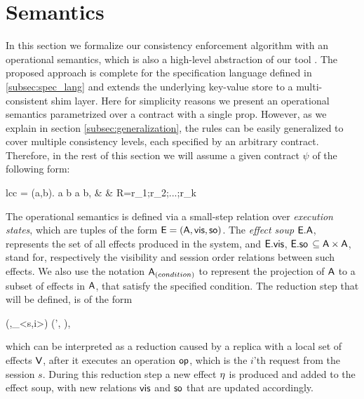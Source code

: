 %
%
\section{Semantics}
\label{sec:semantics}
In this section we formalize our consistency enforcement algorithm with an
operational semantics, which is also a high-level abstraction of our
tool \tool.
The proposed approach is complete for the specification language defined
in \ref{subsec:spec_lang}
and extends the underlying key-value store to a multi-consistent shim
layer. Here for simplicity reasons we present an operational semantics 
parametrized over a contract with a single prop. However, as we explain
in section \ref{subsec:generalization}, the rules can be easily
generalized to cover multiple consistency levels, each specified by an
arbitrary contract. Therefore, in the rest of this section we will assume a given contract $\psi$ of the
following form:
	\begin{smathpar}
	\begin{array}{lcc}
		\psi = \forall (a,b). a  b  \Rightarrow a
		\xrightarrow{\visZ} b, & \spc & R=r_1;r_2;...;r_k \\
	\end{array}
	\end{smathpar}

The operational semantics is defined via a small-step relation over \emph{execution
states}, which are tuples of the form ${\normalfont \textsf{E}}=({\normalfont \textsf{A}},{\normalfont \textsf{vis}} ,{\normalfont \textsf{so}})$.
The \emph{effect soup} ${\normalfont \textsf{E}}.{\normalfont \textsf{A}}$, represents the set of all
effects produced in the system, and  ${\normalfont \textsf{E}}.{\normalfont \textsf{vis}}$,
${\normalfont \textsf{E}}.{\normalfont \textsf{so}}$ $\subseteq {\normalfont \textsf{A}} \times {\normalfont \textsf{A}}$, stand for, respectively the
visibility and session order relations
between such effects. 
We also use the notation ${\normalfont \textsf{A}}_{(condition)}$
to represent the projection of ${\normalfont \textsf{A}}$ to a subset
of effects  in ${\normalfont \textsf{A}}$, that satisfy the specified condition.
The reduction step that will be defined, is of the form
\begin{smathpar}
(\E,\op_{<s,i>}) \;\xrightarrow{\V}\; (\E', \eff),
\end{smathpar}
which can be interpreted as a reduction caused by a replica with a local 
set of effects ${\normalfont \textsf{V}}$, after it executes an operation
${\normalfont \textsf{op}}$, which is the $i$'th request from the session $s$. 
During this reduction step a new effect $\eta$ is produced and added to
the effect soup, with new relations ${\normalfont \textsf{vis}}$ and ${\normalfont \textsf{so}}$ that are updated
accordingly.


